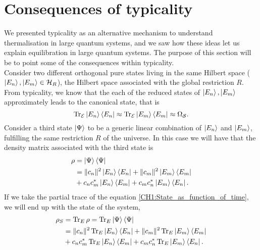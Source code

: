\section{Consequences of typicality}
We presented typicality as an alternative mechanism to understand thermalisation in large quantum systems, and we saw how these ideas let us explain equilibration in large quantum systems. The purpose of this section will be to point some of the consequences within typicality.\\
\indent Consider two different orthogonal pure states living in the same Hilbert space ($\mathinner{|{E_n}\rangle},\mathinner{|{E_m}\rangle} \in \mathcal{H}_{R}$), the Hilbert space associated with the global restriction $R$. From typicality, we know that the each of the reduced states of $\mathinner{|{E_n}\rangle},\mathinner{|{E_m}\rangle}$ approximately leads to the canonical state, that is
\begin{equation}
\operatorname{Tr}_{\mathcal{E}} \mathinner{|{E_n}\rangle}\mathinner{\langle{E_n}|} \approx \operatorname{Tr}_{\mathcal{E}} \mathinner{|{E_m}\rangle}\mathinner{\langle{E_m}|} \approx \Omega_{\mathcal{S}}.
\end{equation}
Consider a third state $\mathinner{|{\Psi}\rangle}$ to be a generic linear combination of $\mathinner{|{E_n}\rangle}$ and $\mathinner{|{E_m}\rangle}$, fulfilling the same restriction $R$ of the universe. In this case we will have that the density matrix associated with the third state is
\begin{equation}
\begin{aligned}
\rho &= \mathinner{|{\Psi}\rangle}\mathinner{\langle{\Psi}|}\\
&= \|c_n\|^2 \mathinner{|{E_n}\rangle}\mathinner{\langle{E_n}|} +  \|c_m\|^2 \mathinner{|{E_m}\rangle}\mathinner{\langle{E_m}|} \\
& + c_n c^{*}_m  \mathinner{|{E_n}\rangle}\mathinner{\langle{E_m}|}+ c_m c^{*}_n \mathinner{|{E_m}\rangle}\mathinner{\langle{E_n}|}.
\end{aligned}
\label{CH1:State_as_function_of_time}
\end{equation}
If we take the partial trace of the equation \eqref{CH1:State_as_function_of_time}, we will end up with the state of the system,
\begin{equation}
\begin{aligned}
\rho_S &= \operatorname{Tr}_E \rho = \operatorname{Tr}_E  \mathinner{|{\Psi}\rangle}\mathinner{\langle{\Psi}|}\\
&= \|c_n\|^2\operatorname{Tr}_E  \mathinner{|{E_n}\rangle}\mathinner{\langle{E_n}|} +  \|c_m\|^2 \operatorname{Tr}_E \mathinner{|{E_m}\rangle}\mathinner{\langle{E_m}|} \\
& + c_n c^{*}_m  \operatorname{Tr}_E \mathinner{|{E_n}\rangle}\mathinner{\langle{E_m}|} + c_m c^{*}_n \operatorname{Tr}_E \mathinner{|{E_m}\rangle}\mathinner{\langle{E_n}|}.
\end{aligned}
\label{CH1:State_as_function_of_time_system}
\end{equation}
